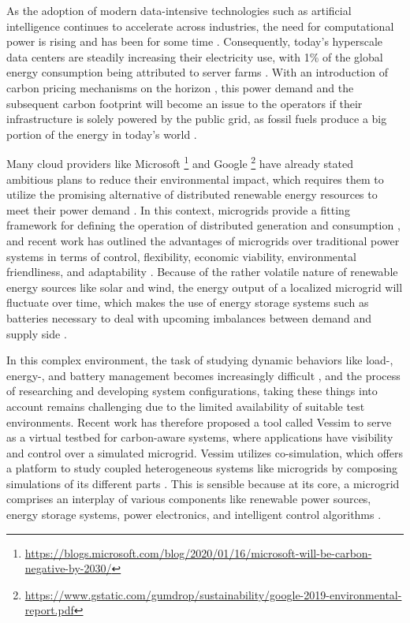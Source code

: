As the adoption of modern data-intensive technologies such as artificial intelligence continues to accelerate across industries, the need for computational power is rising and has been for some time \cite{dhar2020carbon}. Consequently, today's hyperscale data centers are steadily increasing their electricity use, with 1\% of the global energy consumption being attributed to server farms \cite{masanet2020recalibrating}. With an introduction of carbon pricing mechanisms on the horizon \cite{boyce2018carbon, best2020carbon}, this power demand and the subsequent carbon footprint will become an issue to the operators if their infrastructure is solely powered by the public grid, as fossil fuels produce a big portion of the energy in today's world \cite{SustainableEdgeComputing}.

Many cloud providers like Microsoft \footnote{\url{https://blogs.microsoft.com/blog/2020/01/16/microsoft-will-be-carbon-negative-by-2030/}} and Google \footnote{\url{https://www.gstatic.com/gumdrop/sustainability/google-2019-environmental-report.pdf}} have already stated ambitious plans to reduce their environmental impact, which requires them to utilize the promising alternative of distributed renewable energy resources to meet their power demand \cite{MicrogridReview}. In this context, microgrids provide a fitting framework for defining the operation of distributed generation and consumption \cite{Microgrid}, and recent work has outlined the advantages of microgrids over traditional power systems in terms of control, flexibility, economic viability, environmental friendliness, and adaptability \cite{MicrogridPerspectives}. Because of the rather volatile nature of renewable energy sources like solar and wind, the energy output of a localized microgrid will fluctuate over time, which makes the use of energy storage systems such as batteries necessary to deal with upcoming imbalances between demand and supply side \cite{MicrogridStorageAdvances}.

In this complex environment, the task of studying dynamic behaviors like load-, energy-, and battery management becomes increasingly difficult \cite{yu2016distributed}, and the process of researching and developing system configurations, taking these things into account remains challenging due to the limited availability of suitable test environments. Recent work has therefore proposed a tool called Vessim \cite{vessim} to serve as a virtual testbed for carbon-aware systems, where applications have visibility and control over a simulated microgrid. Vessim utilizes co-simulation, which offers a platform to study coupled heterogeneous systems like microgrids by composing simulations of its different parts \cite{gomes2018co}. This is sensible because at its core, a microgrid comprises an interplay of various components like renewable power sources, energy storage systems, power electronics, and intelligent control algorithms \cite{alzahrani2017modeling}.

